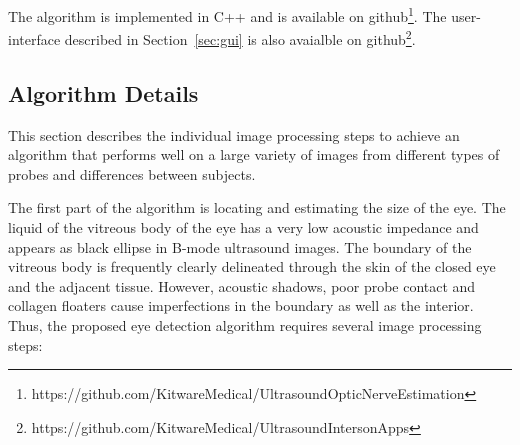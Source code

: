 \documentclass{llncs}
\begin{document}
The algorithm is implemented in C++ and is available on
github\footnote{https://github.com/KitwareMedical/UltrasoundOpticNerveEstimation}.
The user-interface described in Section~\ref{sec:gui} is also avaialble on
github\footnote{https://github.com/KitwareMedical/UltrasoundIntersonApps}.

\subsection{Algorithm Details}
\label{sec:details}
This section describes the individual image processing steps to achieve an
algorithm that performs well on a large variety of images from different types
of probes and differences between subjects.

The first part of the algorithm is locating and estimating the size of the eye.
The liquid of the vitreous body of the eye has a very low acoustic impedance and
appears as black ellipse in B-mode ultrasound images. The boundary of the
vitreous body is frequently clearly delineated through the skin of the closed
eye and the adjacent tissue. However, acoustic shadows, poor probe contact and
collagen floaters cause imperfections in the boundary as well as the interior.
Thus, the proposed eye detection algorithm requires several image processing
steps: 
\end{document}
